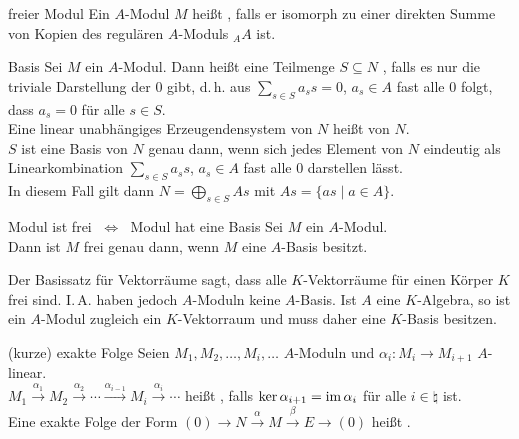 \begin{Def}{freier Modul}
    Ein $A$-Modul $M$ heißt ,
    falls er isomorph zu einer direkten Summe von Kopien des
    regulären $A$-Moduls ${}_A A$ ist.
\end{Def}

\begin{Def}{Basis}
    Sei $M$ ein $A$-Modul.
    Dann heißt eine Teilmenge $S \subseteq N$ ,
    falls es nur die triviale Darstellung der $0$ gibt, d.\,h.
    aus $\sum_{s \in S} a_s s = 0$, $a_s \in A$ fast alle $0$ folgt,
    dass $a_s = 0$ für alle $s \in S$. \\
    Eine linear unabhängiges Erzeugendensystem von $N$ heißt
     von $N$. \\
    $S$ ist eine Basis von $N$ genau dann, wenn
    sich jedes Element von $N$ eindeutig als Linearkombination
    $\sum_{s \in S} a_s s$, $a_s \in A$ fast alle $0$ darstellen
    lässt. \\
    In diesem Fall gilt dann $N = \bigoplus_{s \in S} A s$
    mit $A s = \{as \;|\; a \in A\}$.
\end{Def}

\pagebreak

\begin{Satz}{Modul ist frei $\;\Leftrightarrow\;$ Modul hat eine Basis}
    Sei $M$ ein $A$-Modul. \\
    Dann ist $M$ frei genau dann, wenn
    $M$ eine $A$-Basis besitzt.
\end{Satz}

\begin{Bem}
    Der Basissatz für Vektorräume sagt, dass alle $K$-Vektorräume
    für einen Körper $K$ frei sind.
    I.\,A. haben jedoch $A$-Moduln keine $A$-Basis.
    Ist $A$ eine $K$-Algebra, so ist ein $A$-Modul zugleich ein
    $K$-Vektorraum und muss daher eine $K$-Basis besitzen.
\end{Bem}

\begin{Def}{(kurze) exakte Folge}
    Seien $M_1, M_2, \dotsc, M_i, \dotsc$ $A$-Moduln und
    $\alpha_i: M_i \rightarrow M_{i+1}$ $A$-linear. \\
    $M_1 \xrightarrow{\alpha_1} M_2 \xrightarrow{\alpha_2} \dotsb
    \xrightarrow{\alpha_{i-1}} M_i \xrightarrow{\alpha_i} \dotsb$
    heißt , falls $\ker \alpha_{i+1} = \operatorname{im} \alpha_i$
    für alle $i \in \natural$ ist. \\
    Eine exakte Folge der Form $(0) \rightarrow N \xrightarrow{\alpha} M
    \xrightarrow{\beta} E \rightarrow (0)$
    heißt .
\end{Def}

